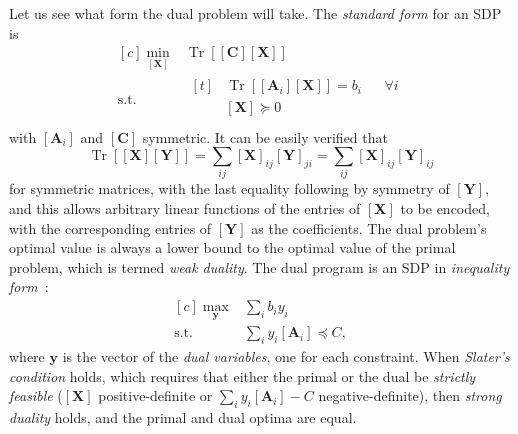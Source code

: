 \documentclass[10pt, a4paper]{article}
\numberwithin{equation}{section} %
\theoremstyle{definition}
\theoremstyle{plain}
\newcommand{\?}{\mathrel{?}} %
\newcommand{\cvec}[1]{\boldsymbol{\mathbf{#1}}}    %
\newcommand{\matr}[2][]{\left[\mathbf{#2}#1\right]} %
\newcommand{\Tr}[2][]{\mathop{\mathrm{Tr}#1}\left[ #2 \right]} %
\begin{document}
                      Let us see what form the dual problem will take. The \emph{standard form} for an SDP is~\cite[Ch. 4.6.2]{BoydVand}
                      \begin{equation}
                        \begin{aligned}[c]
                          \min_{\matr{X}} & \Tr{ \matr{C}\matr{X} } \\
                          \text{s.t.} & \begin{aligned}[t]
                                  & \Tr{ \matr[_i]{A} \matr{X} } = b_i & & \forall i \\
                                  & \matr{X} \succeq 0 & & \\
                          \end{aligned}
                          \end{aligned}
                        \end{equation}
                        with \(\matr[_i]{A}\) and \(\matr{C}\) symmetric. It can be easily verified that
                        \begin{equation}
                          \Tr{\matr{X}\matr{Y}} = \sum_{ij} \matr{X}_{ij} \matr{Y}_{ji} = \sum_{ij} \matr{X}_{ij} \matr{Y}_{ij}
                        \end{equation}
                        for symmetric matrices, with the last equality following by symmetry of \(\matr{Y}\), and this allows arbitrary linear functions of the entries of \(\matr{X}\) to be encoded, with the corresponding entries of \(\matr{Y}\) as the coefficients. The dual problem's optimal value is always a lower bound to the optimal value of the primal problem, which is termed \emph{weak duality}. The dual program is an SDP in \emph{inequality form}~\cite[Ch. 5.9]{BoydVand}:
                        \begin{equation}
                          \begin{aligned}[c]
                            \max_{\cvec{y}} & \sum_{i} b_i y_i \\
                            \text{s.t.} & \sum_{i} y_i \matr[_i]{A} \preceq C,
                          \end{aligned}
                        \end{equation}
                        where \(\cvec{y}\) is the vector of the \emph{dual variables}, one for each constraint. When \emph{Slater's condition} holds, which requires that either the primal or the dual be \emph{strictly feasible} (\(\matr{X}\) positive-definite or \(\sum_{i} y_i \matr[_i]{A} - C\) negative-definite), then \emph{strong duality} holds, and the primal and dual optima are equal.
\end{document}
